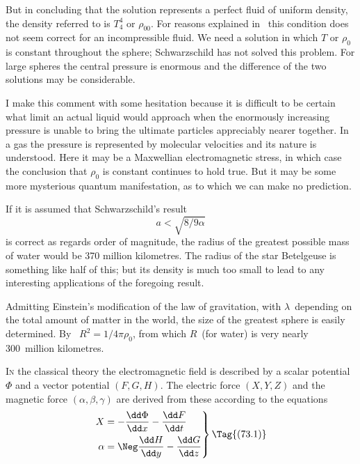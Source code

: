 \documentclass[12pt]{book}
\begin{document}
But in concluding that the solution represents a perfect fluid of uniform density, the density referred to is $T_4^4$
or $\rho_{00}$. For reasons explained in~ this condition does not seem correct for an incompressible fluid.
We need a solution in which $T$ or $\rho_0$ is constant throughout the sphere; Schwarzschild has not solved this
problem.
For large spheres the central pressure is enormous and the difference of the two solutions may be considerable.

I make this comment with some hesitation because it is difficult to be certain what limit an actual liquid would
approach when the enormously increasing pressure is unable to bring the ultimate particles appreciably nearer
together.
In a gas the pressure is represented by molecular velocities and its nature is understood.
Here it may be a Maxwellian electromagnetic stress, in which case the conclusion that $\rho_0$ is constant continues
to hold true. But it may be some more mysterious quantum manifestation, as to which we can make no prediction.

If it is assumed that Schwarzschild's result
\[
a < \sqrt{8/9\alpha}
\]
is correct as regards order of magnitude, the radius of the greatest possible
mass of water would be 370 million kilometres.
The radius of the star Betelgeuse is something like half of this; but its density is much too small to lead
to any interesting applications of the foregoing result.

Admitting Einstein's modification of the law of gravitation, with $\lambda$~depending
on the total amount of matter in the world, the size of the greatest
sphere is easily determined. By~ $R^{2} = 1/4\pi\rho_{0}$, from which $R$~(for water)
is very nearly 300~million kilometres.


%
%
%

\lettrine{I}{n} the classical theory the electromagnetic field is described by a scalar
potential~$\Phi$ and a vector potential $(F, G, H)$. The electric force $(X, Y, Z)$
%
%
and the magnetic force $(\alpha, \beta, \gamma)$ are derived from these according to the
equations
\[
\left.
\begin{aligned}
  X &= -\frac{\dd\Phi}{\dd x} - \frac{\dd F}{\dd t}\\
  \alpha &= \Neg\frac{\dd H}{\dd y} - \frac{\dd G}{\dd z}
\end{aligned}
\right\}
\Tag{(73.1)}
\]
\end{document}
